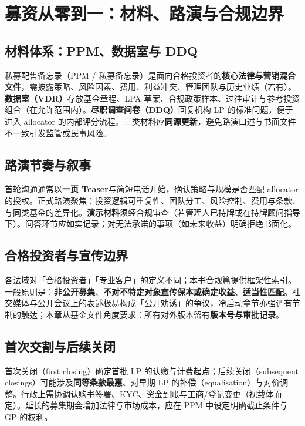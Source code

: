 \chapter{募资从零到一：材料、路演与合规边界}

\section{材料体系：PPM、数据室与 DDQ}

私募配售备忘录（PPM / 私募备忘录）是面向合格投资者的\textbf{核心法律与营销混合文件}，需披露策略、风险因素、费用、利益冲突、管理团队与历史业绩（若有）。\textbf{数据室（VDR）}存放基金章程、LPA 草案、合规政策样本、过往审计与参考投资组合（在允许范围内）。\textbf{尽职调查问卷（DDQ）}回复机构 LP 的标准问题，便于进入 allocator 的内部评分流程。三类材料应\textbf{同源更新}，避免路演口述与书面文件不一致引发监管或民事风险。

\section{路演节奏与叙事}

首轮沟通通常以\textbf{一页 Teaser}与简短电话开始，确认策略与规模是否匹配 allocator 的授权。正式路演聚焦：投资逻辑可重复性、团队分工、风险控制、费用与条款、与同类基金的差异化。\textbf{演示材料}须经合规审查（若管理人已持牌或在持牌顾问指导下）。问答环节应如实记录；对无法承诺的事项（如未来收益）明确拒绝书面化。

\section{合格投资者与宣传边界}

各法域对「合格投资者」「专业客户」的定义不同；本书合规篇提供框架性索引。一般原则是：\textbf{非公开募集}、\textbf{不对不特定对象宣传保本或确定收益}、\textbf{适当性匹配}。社交媒体与公开会议上的表述极易构成「公开劝诱」的争议，冷启动章节亦强调有节制的触达；本章从基金文件角度要求：所有对外版本留有\textbf{版本号与审批记录}。

\section{首次交割与后续关闭}

首次关闭（first closing）确定首批 LP 的认缴与计费起点；后续关闭（subsequent closings）可能涉及\textbf{同等条款最惠}、对早期 LP 的补偿（equalisation）与对价调整。行政上需协调认购书签署、KYC、资金到账与工商/登记变更（视载体而定）。延长的募集期会增加法律与市场成本，应在 PPM 中设定明确截止条件与 GP 的权利。
